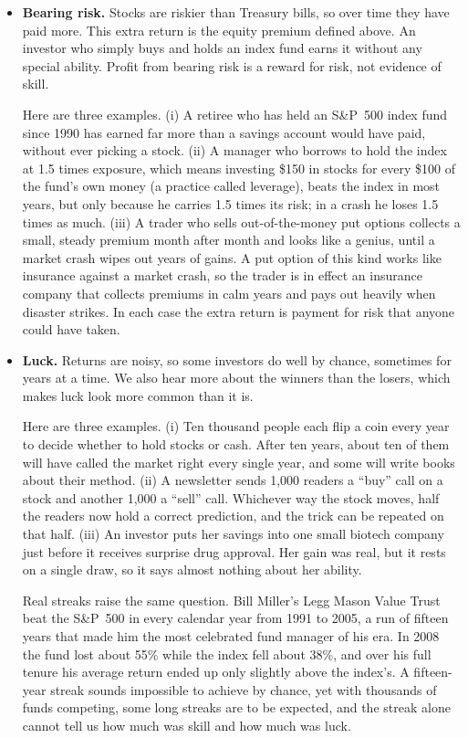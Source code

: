 \begin{itemize}
  \item \textbf{Bearing risk.} Stocks are riskier than Treasury bills, so over
  time they have paid more. This extra return is the equity premium defined
  above. An investor who simply buys and holds an index fund earns it without
  any special ability. Profit from bearing risk is a reward for risk, not
  evidence of skill.

  Here are three examples. (i) A retiree who has held an S\&P~500 index fund since
  1990 has earned far more than a savings account would have paid, without
  ever picking a stock. (ii) A manager who borrows to hold the index at
  1.5 times exposure, which means investing \$150 in stocks for every \$100
  of the fund's own money (a practice called leverage), beats the index in most years, but only because he
  carries 1.5 times its risk; in a crash he loses 1.5 times as much.
  (iii) A trader who sells out-of-the-money put options collects a small,
  steady premium month after month and looks like a genius, until a market
  crash wipes out years of gains. A put option of this kind works like
  insurance against a market crash, so the trader is in effect an insurance
  company that collects premiums in calm years and pays out heavily when
  disaster strikes. In each case the extra return is payment
  for risk that anyone could have taken.

  \item \textbf{Luck.} Returns are noisy, so some investors do well by
  chance, sometimes for years at a time. We also hear more about the winners
  than the losers, which makes luck look more common than it is.

  Here are three examples. (i) Ten thousand people each flip a coin every year to
  decide whether to hold stocks or cash. After ten years, about ten of them
  will have called the market right every single year, and some will write
  books about their method. (ii) A newsletter sends 1{,}000 readers a
  ``buy'' call on a stock and another 1{,}000 a ``sell'' call. Whichever way
  the stock moves, half the readers now hold a correct prediction, and the
  trick can be repeated on that half. (iii) An investor puts her savings into
  one small biotech company just before it receives surprise drug approval.
  Her gain was real, but it rests on a single draw, so it says almost nothing
  about her ability.

  Real streaks raise the same question. Bill Miller's Legg Mason Value Trust
  beat the S\&P~500 in every calendar year from 1991 to 2005, a run of fifteen
  years that made him the most celebrated fund manager of his era. In 2008
  the fund lost about 55\% while the index fell about 38\%, and over his full
  tenure his average return ended up only slightly above the index's. A
  fifteen-year streak sounds impossible to achieve by chance, yet with
  thousands of funds competing, some long streaks are to be expected, and
  the streak alone cannot tell us how much was skill and how much was luck.



\end{itemize}
